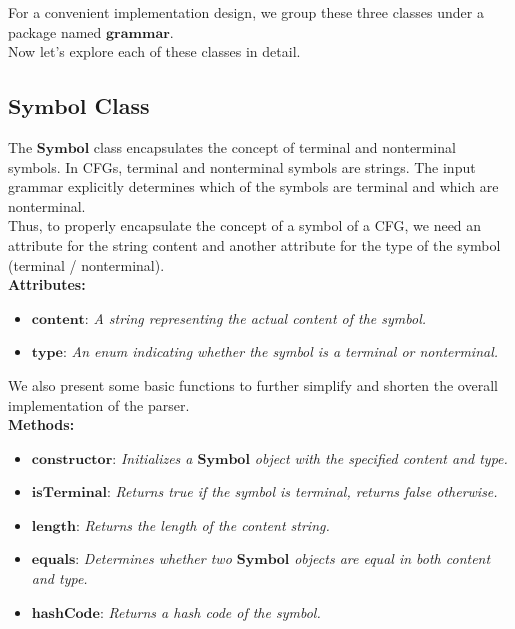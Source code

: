 For a convenient implementation design, we group these three classes under a package named \(\boldsymbol{grammar}\).\\

Now let’s explore each of these classes in detail.

\subsection*{\(\boldsymbol{Symbol}\) Class}

The \(\boldsymbol{Symbol}\) class encapsulates the concept of terminal and nonterminal symbols. In CFGs, terminal and nonterminal symbols are strings. The input grammar explicitly determines which of the symbols are terminal and which are nonterminal.\\
Thus, to properly encapsulate the concept of a symbol of a CFG, we need an attribute for the string content and another attribute for the type of the symbol (terminal / nonterminal).\\

\textbf{Attributes:}
\begin{itemize}
    \item \(\boldsymbol{content}\): \textit{A string representing the actual content of the symbol.}
    \item \(\boldsymbol{type}\): \textit{An enum indicating whether the symbol is a terminal or nonterminal.}
\end{itemize}

We also present some basic functions to further simplify and shorten the overall implementation of the parser.\\

\textbf{Methods:}
\begin{itemize}
    \item \(\boldsymbol{constructor}\): \textit{Initializes a \(\boldsymbol{Symbol}\) object with the specified content and type.}
    \item \(\boldsymbol{isTerminal}\): \textit{Returns true if the symbol is terminal, returns false otherwise.}
    \item \(\boldsymbol{length}\): \textit{Returns the length of the content string.}
    \item \(\boldsymbol{equals}\): \textit{Determines whether two \(\boldsymbol{Symbol}\) objects are equal in both content and type.}
    \item \(\boldsymbol{hashCode}\): \textit{Returns a hash code of the symbol.}
\end{itemize}

